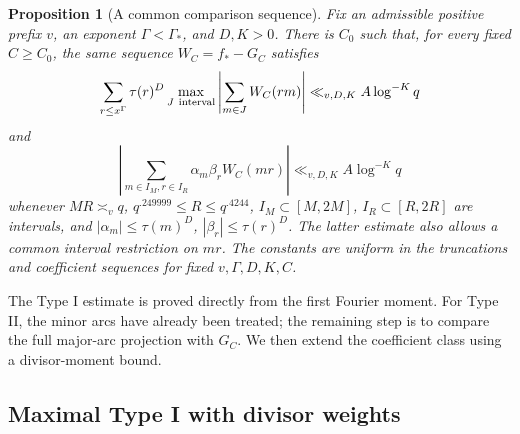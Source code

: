 \documentclass[11pt,a4paper]{article}
\theoremstyle{paperplain}
\newtheorem{proposition}[theorem]{Proposition}
\numberwithin{equation}{section}
\begin{document}
\begin{proposition}[A common comparison sequence]\label{dec:commonmodel}
Fix an admissible positive prefix $v$, an exponent $\Gamma<\Gamma_*$,
and $D,K>0$. There is $C_0$ such that, for every fixed $C\ge C_0$,
the same sequence $W_C=f_*-G_C$ satisfies
\begin{equation}\label{dec:weightedI}
 \sum_{r\le x^\Gamma}\tau(r)^D\max_{J\ {\rm interval}}
 \left|\sum_{m\in J}W_C(rm)\right|
 \ll_{v,D,K}A\log^{-K}q
\end{equation}
and
\begin{equation}\label{dec:fullII}
 \left|\sum_{m\in I_M,r\in I_R}\alpha_m\beta_rW_C(mr)\right|
 \ll_{v,D,K}A\log^{-K}q
\end{equation}
whenever $MR\asymp_vq$, $q^{.249999}\le R\le q^{.4244}$,
$I_M\subset[M,2M]$, $I_R\subset[R,2R]$ are intervals, and
$|\alpha_m|\le\tau(m)^D$, $|\beta_r|\le\tau(r)^D$.
The latter estimate also allows a common interval restriction on $mr$.
The constants are uniform in the truncations and coefficient
sequences for fixed $v,\Gamma,D,K,C$.
\end{proposition}

The Type I estimate is proved directly from the first Fourier moment.
For Type II, the minor arcs have already been treated; the remaining
step is to compare the full major-arc projection with $G_C$.
We then extend the coefficient class using a divisor-moment bound.

\subsection{Maximal Type I with divisor weights}
\end{document}
